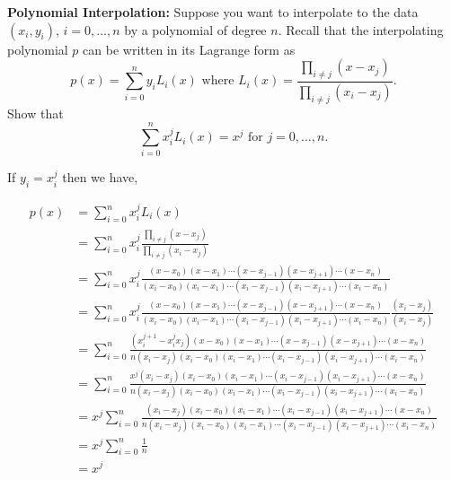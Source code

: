 \textbf{Polynomial Interpolation:}
Suppose you want to interpolate to the data
$(x_i, y_i)$, $i=0,\dots,n$ by a polynomial of degree $n$. Recall that
the interpolating polynomial $p$ can be written in its Lagrange form
as
\[
p(x) = \sum_{i=0}^n y_i L_i(x)\text{    where    } L_i(x) =
\frac{\prod_{i\ne j} (x - x_j)}{\prod_{i \ne j} (x_i - x_j)}.
\]
Show that
\[\sum_{i=0}^n x_i^j L_i(x) = x^j\text{    for    } j=0,\dots,n.\]

{\color{blue}
If $y_i = x_i^j$ then we have,

\[
\begin{aligned}
p(x) &= \sum_{i=0}^n x_i^j L_i(x) \\
&= \sum_{i=0}^n x_i^j \frac{\prod_{i\ne j} (x - x_j)}{\prod_{i \ne j}
  (x_i - x_j)} \\
&= \sum_{i=0}^n x_i^j
\frac{(x - x_0)(x - x_1)\cdots (x - x_{j-1})(x - x_{j+1}) \cdots (x - x_n)}
{(x_i - x_0)(x_i - x_1)\cdots (x_i - x_{j-1})(x_i - x_{j+1}) \cdots (x_i - x_n)} \\
&= \sum_{i=0}^n x_i^j
\frac{(x - x_0)(x - x_1)\cdots (x - x_{j-1})(x - x_{j+1}) \cdots (x - x_n)}
{(x_i - x_0)(x_i - x_1)\cdots (x_i - x_{j-1})(x_i - x_{j+1}) \cdots
  (x_i - x_n)}
\frac{(x_i - x_j)}{(x_i - x_j)} \\
&= \sum_{i=0}^n
\frac{(x_i^{j+1} - x_i^j x_j)(x - x_0)(x - x_1)\cdots (x - x_{j-1})(x - x_{j+1}) \cdots (x - x_n)}
{n (x_i - x_j)(x_i - x_0)(x_i - x_1)\cdots (x_i - x_{j-1})(x_i - x_{j+1}) \cdots
  (x_i - x_n)} \\
&= \sum_{i=0}^n
\frac{x^j (x_i - x_j)(x_i - x_0)(x_i - x_1)\cdots (x_i - x_{j-1})(x_i - x_{j+1}) \cdots
  (x - x_n)}
{n (x_i - x_j)(x_i - x_0)(x_i - x_1)\cdots (x_i - x_{j-1})(x_i - x_{j+1}) \cdots
  (x_i - x_n)} \\
&= x^j \sum_{i=0}^n
\frac{(x_i - x_j)(x_i - x_0)(x_i - x_1)\cdots (x_i - x_{j-1})(x_i - x_{j+1}) \cdots
  (x - x_n)}
{n (x_i - x_j)(x_i - x_0)(x_i - x_1)\cdots (x_i - x_{j-1})(x_i - x_{j+1}) \cdots
  (x_i - x_n)} \\
&= x^j \sum_{i=0}^n
\frac{1} {n} \\
&= x^j
\end{aligned}
\]


}
